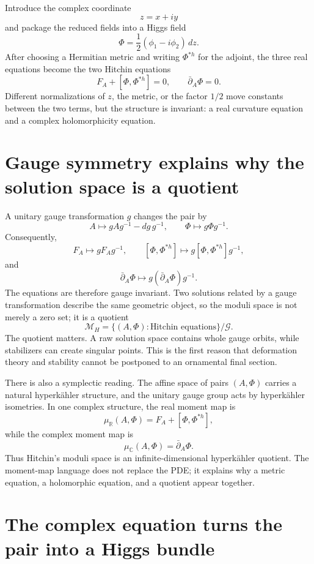 Introduce the complex coordinate
\[
  z=x+iy
\]
and package the reduced fields into a Higgs field
\[
  \Phi=\frac12(\phi_1-i\phi_2)\,dz.
\]
After choosing a Hermitian metric and writing \(\Phi^{*h}\) for the adjoint, the three real equations become the two Hitchin equations
\[
  \boxed{
  F_A+[\Phi,\Phi^{*h}]=0,
  \qquad
  \bar\partial_A\Phi=0.}
\]
Different normalizations of \(z\), the metric, or the factor \(1/2\) move constants between the two terms, but the structure is invariant: a real curvature equation and a complex holomorphicity equation.

\section{Gauge symmetry explains why the solution space is a quotient}

A unitary gauge transformation \(g\) changes the pair by
\[
  A\longmapsto gAg^{-1}-dg\,g^{-1},
  \qquad
  \Phi\longmapsto g\Phi g^{-1}.
\]
Consequently,
\[
  F_A\longmapsto gF_Ag^{-1},
  \qquad
  [\Phi,\Phi^{*h}]\longmapsto
  g[\Phi,\Phi^{*h}]g^{-1},
\]
and
\[
  \bar\partial_A\Phi
  \longmapsto
  g(\bar\partial_A\Phi)g^{-1}.
\]
The equations are therefore gauge invariant.  Two solutions related by a gauge transformation describe the same geometric object, so the moduli space is not merely a zero set; it is a quotient
\[
  \mathcal M_H
  =\{(A,\Phi):\text{Hitchin equations}\}/\mathcal G.
\]
The quotient matters.  A raw solution space contains whole gauge orbits, while stabilizers can create singular points.  This is the first reason that deformation theory and stability cannot be postponed to an ornamental final section.

There is also a symplectic reading.  The affine space of pairs \((A,\Phi)\) carries a natural hyperkähler structure, and the unitary gauge group acts by hyperkähler isometries.  In one complex structure, the real moment map is
\[
  \mu_{\mathbb R}(A,\Phi)
  =F_A+[\Phi,\Phi^{*h}],
\]
while the complex moment map is
\[
  \mu_{\mathbb C}(A,\Phi)
  =\bar\partial_A\Phi.
\]
Thus Hitchin's moduli space is an infinite-dimensional hyperkähler quotient.  The moment-map language does not replace the PDE; it explains why a metric equation, a holomorphic equation, and a quotient appear together.

\section{The complex equation turns the pair into a Higgs bundle}

